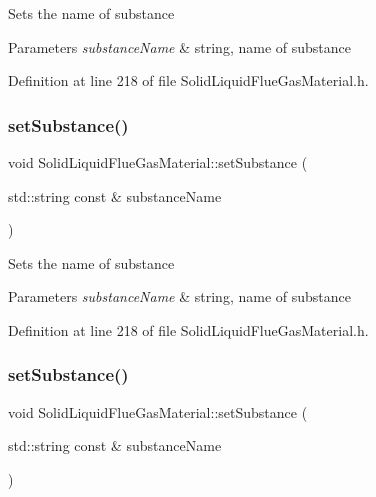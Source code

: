 Sets the name of substance 
\begin{DoxyParams}{Parameters}
{\em substance\+Name} & string, name of substance \\
\hline
\end{DoxyParams}


Definition at line 218 of file Solid\+Liquid\+Flue\+Gas\+Material.\+h.

\mbox{\label{class_solid_liquid_flue_gas_material_a54be915432c1300c4d8eaf7bf2be361f}} 
\subsubsection{\texorpdfstring{set\+Substance()}{setSubstance()}\hspace{0.1cm}{\footnotesize\ttfamily [2/3]}}
{\footnotesize\ttfamily void Solid\+Liquid\+Flue\+Gas\+Material\+::set\+Substance (\begin{DoxyParamCaption}\item[{std\+::string const \&}]{substance\+Name }\end{DoxyParamCaption})\hspace{0.3cm}{\ttfamily [inline]}}

Sets the name of substance 
\begin{DoxyParams}{Parameters}
{\em substance\+Name} & string, name of substance \\
\hline
\end{DoxyParams}


Definition at line 218 of file Solid\+Liquid\+Flue\+Gas\+Material.\+h.

\mbox{\label{class_solid_liquid_flue_gas_material_a54be915432c1300c4d8eaf7bf2be361f}} 
\subsubsection{\texorpdfstring{set\+Substance()}{setSubstance()}\hspace{0.1cm}{\footnotesize\ttfamily [3/3]}}
{\footnotesize\ttfamily void Solid\+Liquid\+Flue\+Gas\+Material\+::set\+Substance (\begin{DoxyParamCaption}\item[{std\+::string const \&}]{substance\+Name }\end{DoxyParamCaption})\hspace{0.3cm}{\ttfamily [inline]}}

